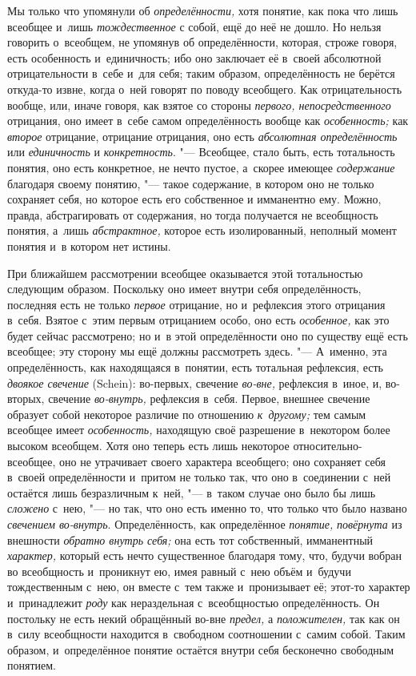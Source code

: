 Мы только что упомянули об {\em определённости,} хотя понятие, как пока что
лишь всеобщее и~лишь {\em тождественное} с
собой, ещё до неё не дошло. Но нельзя говорить о~всеобщем, не упомянув об
определённости, которая, строже говоря, есть особенность и~единичность; ибо
оно заключает её в~своей абсолютной отрицательности в~себе и~для себя;
таким образом, определённость не берётся откуда-то извне, когда о~ней
говорят по поводу всеобщего. Как отрицательность вообще, или, иначе говоря,
как взятое со стороны {\em первого, непосредственного} отрицания, оно
имеет в~себе самом определённость вообще как {\em особенность;} как
{\em второе} отрицание, отрицание отрицания, оно есть {\em абсолютная
определённость} или {\em единичность} и {\em конкретность}. "--- Всеобщее,
стало быть, есть тотальность понятия, оно есть
конкретное, не нечто пустое, а~скорее имеющее {\em содержание}
благодаря своему понятию, "--- такое содержание,
в котором оно не только сохраняет себя, но которое есть его собственное и
имманентно ему. Можно, правда, абстрагировать от содержания, но тогда
получается не всеобщность понятия, а~лишь {\em абстрактное,}
которое есть изолированный, неполный момент понятия и~в котором нет истины.

При ближайшем рассмотрении всеобщее оказывается этой
тотальностью следующим образом. Поскольку оно имеет внутри себя
определённость, последняя есть не только {\em первое} отрицание,
но и~рефлексия этого отрицания в~себя. Взятое с~этим первым отрицанием
особо, оно есть {\em особенное,}
как это будет сейчас рассмотрено; но и~в этой определённости
оно по существу ещё есть всеобщее; эту сторону мы ещё должны рассмотреть
здесь. "--- \label{bkm:bm23a}А~именно, эта определённость, как
находящаяся в~понятии, есть тотальная рефлексия, есть {\em двоякое свечение}
(Schein): во-первых, свечение {\em во-вне,} рефлексия в~иное, и, во-вторых,
свечение {\em во-внутрь,} рефлексия в~себя. Первое, внешнее свечение образует
собой некоторое различие по отношению {\em к~другому;} тем самым всеобщее имеет
{\em особенность,} находящую своё разрешение в~некотором более высоком
всеобщем. Хотя оно теперь есть лишь некоторое относительно-всеобщее, оно не
утрачивает своего характера всеобщего; оно сохраняет себя в~своей
определённости и~притом не только так, что оно в~соединении с~ней остаётся
лишь безразличным к~ней, "--- в~таком случае оно было бы лишь {\em сложено}
с~нею, "--- но так, что оно есть именно то, что только что было названо
{\em свечением во-внутрь}. Определённость, как определённое {\em понятие,}
{\em повёрнута} из внешности {\em обратно внутрь себя;} она есть тот
собственный, имманентный {\em характер,} который есть нечто существенное
благодаря тому, что, будучи вобран во всеобщность и~проникнут ею, имея равный
с~нею объём и~будучи тождественным с~нею, он вместе с~тем также и~пронизывает
её; этот-то характер и~принадлежит {\em роду} как нераздельная с~всеобщностью
определённость. Он постольку не есть некий обращённый во-вне {\em предел,}
а {\em положителен,} так как он в~силу всеобщности находится в~свободном
соотношении с~самим собой. Таким образом, и~определённое понятие остаётся
внутри себя бесконечно свободным понятием.

